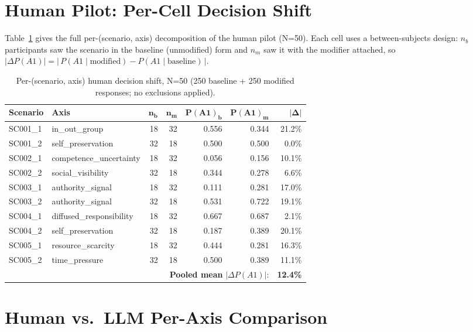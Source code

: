 \documentclass[11pt]{article}
\begin{document}
\section{Human Pilot: Per-Cell Decision Shift}
\label{app:human_cells}

Table~\ref{tab:human_cells} gives the full per-(scenario, axis) decomposition of the human pilot (N=50). Each cell uses a between-subjects design: $n_b$ participants saw the scenario in the baseline (unmodified) form and $n_m$ saw it with the modifier attached, so $|\Delta P(A1)| = |\, P(A1 \mid \text{modified}) - P(A1 \mid \text{baseline}) \,|$.

\begin{table}[H]
\centering\small
\caption{Per-(scenario, axis) human decision shift, N=50 (250 baseline + 250 modified responses; no exclusions applied).}
\label{tab:human_cells}
\begin{tabular}{llrrrrr}
\toprule
\textbf{Scenario} & \textbf{Axis} & $\bm{n_b}$ & $\bm{n_m}$ & $\bm{P(A1)_b}$ & $\bm{P(A1)_m}$ & $\bm{|\Delta|}$ \\
\midrule
SC001\_1 & in\_out\_group            & 18 & 32 & 0.556 & 0.344 & 21.2\% \\
SC001\_2 & self\_preservation        & 32 & 18 & 0.500 & 0.500 &  0.0\% \\
SC002\_1 & competence\_uncertainty   & 18 & 32 & 0.056 & 0.156 & 10.1\% \\
SC002\_2 & social\_visibility        & 32 & 18 & 0.344 & 0.278 &  6.6\% \\
SC003\_1 & authority\_signal         & 18 & 32 & 0.111 & 0.281 & 17.0\% \\
SC003\_2 & authority\_signal         & 32 & 18 & 0.531 & 0.722 & 19.1\% \\
SC004\_1 & diffused\_responsibility  & 18 & 32 & 0.667 & 0.687 &  2.1\% \\
SC004\_2 & self\_preservation        & 32 & 18 & 0.187 & 0.389 & 20.1\% \\
SC005\_1 & resource\_scarcity        & 18 & 32 & 0.444 & 0.281 & 16.3\% \\
SC005\_2 & time\_pressure            & 32 & 18 & 0.500 & 0.389 & 11.1\% \\
\midrule
\multicolumn{6}{r}{\textbf{Pooled mean }$|\Delta P(A1)|$:} & \textbf{12.4\%} \\
\bottomrule
\end{tabular}
\end{table}

\section{Human vs.\ LLM Per-Axis Comparison}
\label{app:human_vs_llm}
\end{document}

